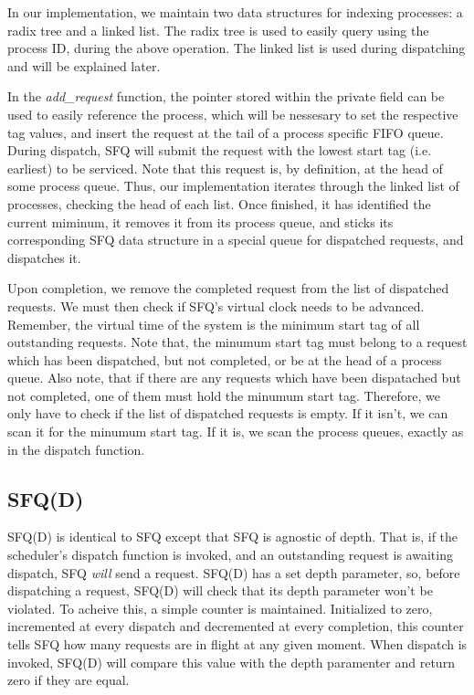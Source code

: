 In our implementation, we maintain two data structures for indexing
processes: a radix tree and a linked list. The radix tree is used to
easily query using the process ID, during the above operation. The
linked list is used during dispatching and will be explained later.

In the \emph{add\_request} function, the pointer stored within the
private field can be used to easily reference the process, which will
be nessesary to set the respective tag values, and insert the request
at the tail of a process specific FIFO queue. During dispatch, SFQ
will submit the request with the lowest start tag (i.e. earliest) to
be serviced. Note that this request is, by definition, at the head of
some process queue. Thus, our implementation iterates through the
linked list of processes, checking the head of each list. Once
finished, it has identified the current miminum, it removes it from
its process queue, and sticks its corresponding SFQ data structure in
a special queue for dispatched requests, and dispatches it.

Upon completion, we remove the completed request from the list of
dispatched requests. We must then check if SFQ's virtual clock needs
to be advanced. Remember, the virtual time of the system is the
minimum start tag of all outstanding requests. Note that, the minumum
start tag must belong to a request which has been dispatched, but not
completed, or be at the head of a process queue. Also note, that if
there are any requests which have been dispatached but not completed,
one of them must hold the minumum start tag. Therefore, we only have
to check if the list of dispatched requests is empty. If it isn't, we
can scan it for the minumum start tag. If it is, we scan the process
queues, exactly as in the dispatch function. 

\subsection{SFQ(D)}

SFQ(D) is identical to SFQ except that SFQ is agnostic of depth. That
is, if the scheduler's dispatch function is invoked, and an
outstanding request is awaiting dispatch, SFQ \emph{will} send a
request. SFQ(D) has a set depth parameter, so, before dispatching a
request, SFQ(D) will check that its depth parameter won't be
violated. To acheive this, a simple counter is maintained. Initialized
to zero, incremented at every dispatch and decremented at every
completion, this counter tells SFQ how many requests are in flight at
any given moment. When dispatch is invoked, SFQ(D) will compare this
value with the depth paramenter and return zero if they are equal.

